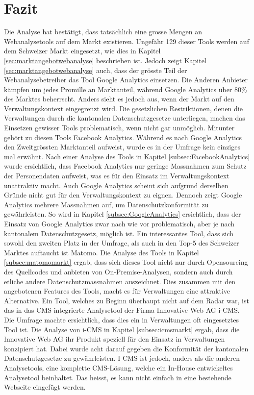 \chapter{Fazit}
Die Analyse hat bestätigt, dass tatsächlich eine grosse Mengen an Webanalysetools auf dem Markt existieren. Ungefähr 129 dieser Tools werden auf dem Schweizer Markt eingesetzt, wie dies in Kapitel \ref{sec:marktangebotwebanalyse} beschrieben ist. Jedoch zeigt Kapitel \ref{sec:marktangebotwebanalyse} auch, dass der grösste Teil der Webanalysebetreiber das Tool Google Analytics einsetzen. Die Anderen Anbieter kämpfen um jedes Promille an Marktanteil, während Google Analytics über 80\% des Marktes beherrscht. Anders sieht es jedoch aus, wenn der Markt auf den Verwaltungskontext eingegrenzt wird. Die gesetzlichen Restriktionen, denen die Verwaltungen durch die kantonalen Datenschutzgesetze unterliegen, machen das Einsetzen gewisser Tools problematisch, wenn nicht gar unmöglich. Mitunter gehört zu diesen Tools Facebook Analytics. Während es nach Google Analytics den Zweitgrössten Marktanteil aufweist, wurde es in der Umfrage kein einziges mal erwähnt. Nach einer Analyse des Tools in Kapitel \ref{subsec:FacebookAnalytics} wurde ersichtlich, dass Facebook Analytics nur geringe Massnahmen zum Schutz der Personendaten aufweist, was es für den Einsatz im Verwaltungskontext unattraktiv macht. Auch Google Analytics scheint sich aufgrund derselben Gründe nicht gut für den Verwaltungskontext zu eignen. Dennoch zeigt Google Analytics mehrere Massnahmen auf, um Datenschutzkonformität zu gewährleisten. So wird in Kapitel \ref{subsec:GoogleAnalytics} ersichtlich, dass der Einsatz von Google Analytics zwar nach wie vor problematisch, aber je nach kantonalem Datenschutzgesetz, möglich ist. Ein interessantes Tool, dass sich sowohl den zweiten Platz in der Umfrage, als auch in den Top-5 des Schweizer Marktes auftaucht ist Matomo.
Die Analyse des Tools in Kapitel \ref{subsec:matomomarkt} ergab, dass sich dieses Tool nicht nur durch Opensourcing des Quellcodes und anbieten von On-Premise-Analysen, sondern auch durch etliche andere Datenschutzmassnahmen auszeichnet. Dies zusammen mit den angebotenen Features des Tools, macht es für Verwaltungen eine attraktive Alternative. Ein Tool, welches zu Beginn überhaupt nicht auf dem Radar war, ist das in das CMS integrierte Analysetool der Firma Innovative Web AG i-CMS. Die Umfrage machte ersichtlich, dass dies ein in Verwaltungen oft eingesetztes Tool ist. Die Analyse von i-CMS in Kapitel \ref{subsec:icmsmarkt} ergab, dass die Innovative Web AG ihr Produkt speziell für den Einsatz in Verwaltungen konzipiert hat. Dabei wurde acht darauf gegeben die Konformität der kantonalen Datenschutzgesetze zu gewährleisten. I-CMS ist jedoch, anders als die anderen Analysetools, eine komplette CMS-Lösung, welche ein In-House entwickeltes Analysetool beinhaltet. Das heisst, es kann nicht einfach in eine bestehende Webseite eingefügt werden. 

